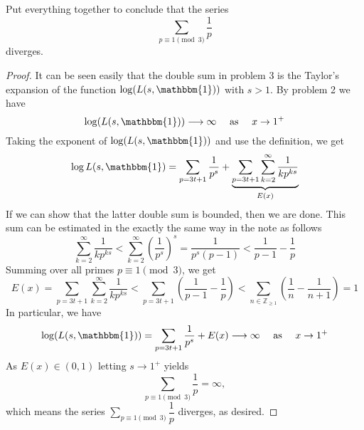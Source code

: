 \documentclass[11pt,letterpaper]{article}
\newcounter{problem}
\DeclareMathOperator{\1}{\mathbbm{1}}
\begin{document}
\begin{exercise}
  Put everything together to conclude that the series $$\displaystyle\sum_{p \equiv 1 \pmod 3} \dfrac{1}{p}$$ diverges.
\end{exercise}
\begin{proof}
  It can be seen easily that the double sum in problem 3 is the Taylor's expansion of the function
  $\log(L(s,\mathbbm{1}))$ with $s>1$. By problem 2 we have
  \[ \log(L(s,\mathbbm{1})) \longrightarrow \infty \quad \text{ as } \quad x \to 1^+\]
  Taking the exponent of $\log(L(s,\mathbbm{1}))$ and use the definition, we get
  \[ \log L(s,\mathbbm{1}) = \sum_{p=3t+1} \dfrac{1}{p^s} + \underbrace{\sum_{p=3t+1}\sum_{k=2}^\infty  \dfrac{1}{kp^{ks}}}_{E(x)}\]
  If we can show that the latter double sum is bounded, then we are done. This sum can be estimated in the exactly the same way
  in the note as follows
  \[\sum_{k=2}^\infty  \dfrac{1}{kp^{ks}} < \sum_{k=2}^\infty \left(\dfrac{1}{p^s}\right)^s= \dfrac{1}{p^s(p-1)} < \dfrac{1}{p-1}-\dfrac{1}{p} \]
  Summing over all primes $p \equiv 1 \pmod 3$, we get
  \[E(x) = \sum_{p=3t+1}\sum_{k=2}^\infty  \dfrac{1}{kp^{ks}} < \sum_{p=3t+1} \left(\dfrac{1}{p-1}-\dfrac{1}{p}\right) < \sum_{n \in \mathbb{Z}_{\ge 1}}\left(\dfrac{1}{n}-\dfrac{1}{n+1}\right)=1\]
  In particular, we have
  \[ \log(L(s,\mathbbm{1})) = \sum_{p=3t+1} \dfrac{1}{p^s} + E(x) \longrightarrow \infty \quad \text{ as } \quad x \to 1^+\]
  As $E(x) \in (0,1)$ letting $s \to 1^+$ yields
  \[\sum_{p \equiv 1 \pmod 3} \dfrac{1}{p} =\infty,\]
  which means the series $\displaystyle\sum_{p \equiv 1 \pmod 3} \dfrac{1}{p}$ diverges, as desired.
\end{proof}
\end{document}
